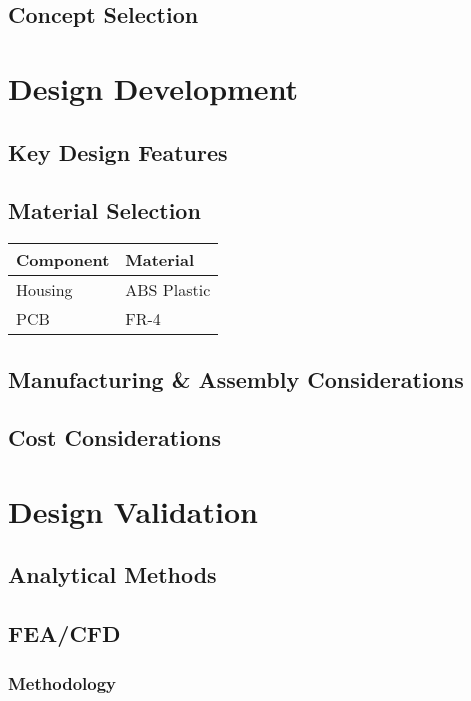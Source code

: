 \documentclass[10pt]{article}
\makeatletter
\newenvironment{fullwidthtable}
  {\begin{center}
   \begin{tabular*}{\textwidth}{@{\extracolsep{\fill}}ll@{}}}
  {\end{tabular*}
   \end{center}}
\makeatother
\begin{document}
\subsection{Concept Selection}

\section{Design Development}
\subsection{Key Design Features}

\subsection{Material Selection}

\begin{fullwidthtable}
\toprule
\textbf{Component} & \textbf{Material} \\
\midrule
Housing & ABS Plastic \\
PCB & FR-4 \\
\bottomrule
\end{fullwidthtable}

\subsection{Manufacturing \& Assembly Considerations}

\subsection{Cost Considerations}

\section{Design Validation}
\subsection{Analytical Methods}

\subsection{FEA/CFD}
\subsubsection{Methodology}
\end{document}
